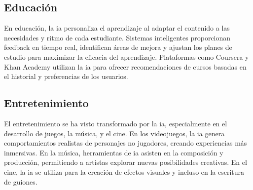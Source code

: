 \subsection{Educación}

En educación, la \acrshort{ia} personaliza el aprendizaje al adaptar el contenido a las necesidades y ritmo de cada estudiante. Sistemas inteligentes proporcionan feedback en tiempo real, identifican áreas de mejora y ajustan los planes de estudio para maximizar la eficacia del aprendizaje. Plataformas como Coursera y Khan Academy utilizan la \acrshort{ia} para ofrecer recomendaciones de cursos basadas en el historial y preferencias de los usuarios.

\subsection{Entretenimiento}

El entretenimiento se ha visto transformado por la \acrshort{ia}, especialmente en el desarrollo de juegos, la música, y el cine. En los videojuegos, la \acrshort{ia} genera comportamientos realistas de personajes no jugadores, creando experiencias más inmersivas. En la música, herramientas de \acrshort{ia} asisten en la composición y producción, permitiendo a artistas explorar nuevas posibilidades creativas. En el cine, la \acrshort{ia} se utiliza para la creación de efectos visuales y incluso en la escritura de guiones.